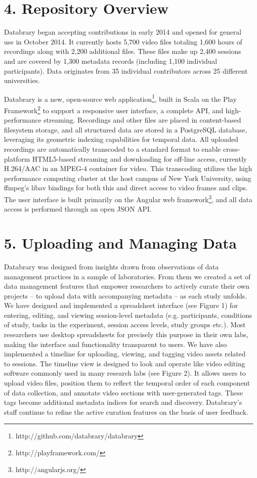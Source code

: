\documentclass{sig-alternate}
\begin{document}
\section{4. Repository Overview}
Databrary began accepting contributions in early 2014 and opened for general use in October 2014.
It currently hosts 5,700 video files totaling 1,600 hours of recordings along with 2,200 additional files.
These files make up 2,400 sessions and are covered by 1,300 metadata records (including 1,100 individual participants).
Data originates from 35 individual contributors across 25 different universities.

Databrary is a new, open-source web application\footnote{http://github.com/databrary/databrary}, built in Scala on the Play Framework\footnote{http://playframework.com/} to support a responsive user interface, a complete API, and high-performance streaming.
Recordings and other files are placed in content-based filesystem storage, and all structured data are stored in a PostgreSQL database, leveraging its geometric indexing capabilities for temporal data.
All uploaded recordings are automatically transcoded to a standard format to enable cross-platform HTML5-based streaming and downloading for off-line access, currently H.264/AAC in an MPEG-4 container for video.
This transcoding utilizes the high performance computing cluster at the host campus of New York University, using ffmpeg's libav bindings for both this and direct access to video frames and clips.
The user interface is built primarily on the Angular web framework\footnote{http://angularjs.org/}, and all data access is performed through an open JSON API.

\section{5. Uploading and Managing Data}

Databrary was designed from insights drawn from observations of data management practices in a sample of laboratories. 
From them we created a set of data management features that empower researchers to actively curate their own projects – to upload data with accompanying metadata – as each study unfolds. 
We have designed and implemented a spreadsheet interface (see Figure 1) for entering, editing, and viewing session-level metadata (e.g. participants, conditions of study, tasks in the experiment, session access levels, study groups etc.). 
Most researchers use desktop spreadsheets for precisely this purpose in their own labs, making the interface and functionality transparent to users.  We have also implemented a timeline for uploading, viewing, and tagging video assets related to sessions.  The timeline view is designed to look and operate like video editing software commonly used in many research labs (see Figure 2).
It allows users to upload video files, position them to reflect the temporal order of each component of data collection, and annotate video sections with user-generated tags. 
These tags become additional metadata indices for search and discovery. 
Databrary’s staff continue to refine the active curation features on the basis of user feedback.
\end{document}
